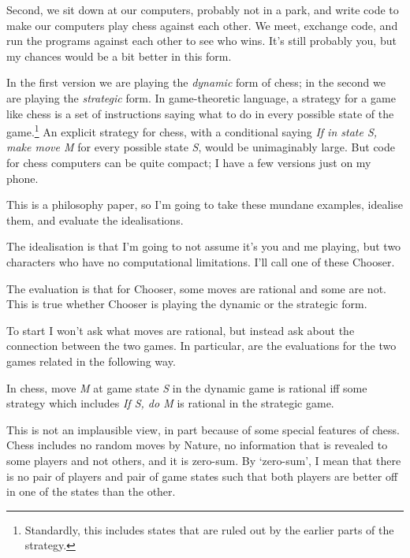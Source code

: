 \documentclass[
  10pt,
  letterpaper,
  DIV=11,
  numbers=noendperiod,
  twoside]{scrartcl}
\providecommand{\tightlist}{%
  \setlength{\itemsep}{0pt}\setlength{\parskip}{0pt}}\usepackage{longtable,booktabs,array}
\begin{document}
Second, we sit down at our computers, probably not in a park, and write
code to make our computers play chess against each other. We meet,
exchange code, and run the programs against each other to see who wins.
It's still probably you, but my chances would be a bit better in this
form.

In the first version we are playing the \emph{dynamic} form of chess; in
the second we are playing the \emph{strategic} form. In game-theoretic
language, a strategy for a game like chess is a set of instructions
saying what to do in every possible state of the game.\footnote{Standardly,
  this includes states that are ruled out by the earlier parts of the
  strategy.} An explicit strategy for chess, with a conditional saying
\emph{If in state S, make move M} for every possible state \emph{S},
would be unimaginably large. But code for chess computers can be quite
compact; I have a few versions just on my phone.

This is a philosophy paper, so I'm going to take these mundane examples,
idealise them, and evaluate the idealisations.

The idealisation is that I'm going to not assume it's you and me
playing, but two characters who have no computational limitations. I'll
call one of these Chooser.

The evaluation is that for Chooser, some moves are rational and some are
not. This is true whether Chooser is playing the dynamic or the
strategic form.

To start I won't ask what moves are rational, but instead ask about the
connection between the two games. In particular, are the evaluations for
the two games related in the following way.

\begin{description}
\tightlist
\item[Dynamic-Strategic Equivalance (for chess)]
In chess, move \emph{M} at game state \emph{S} in the dynamic game is
rational iff some strategy which includes \emph{If S, do M} is rational
in the strategic game.
\end{description}

This is not an implausible view, in part because of some special
features of chess. Chess includes no random moves by Nature, no
information that is revealed to some players and not others, and it is
zero-sum. By `zero-sum', I mean that there is no pair of players and
pair of game states such that both players are better off in one of the
states than the other.
\end{document}
